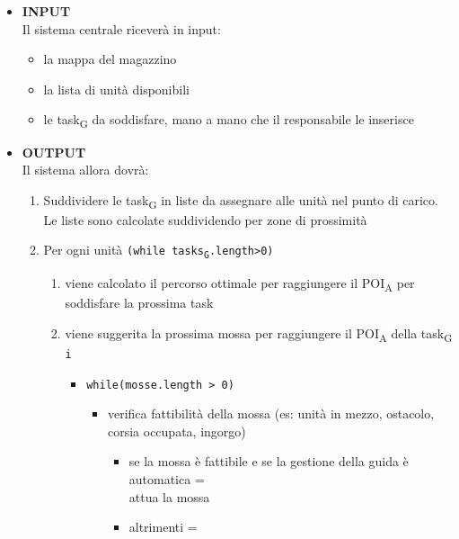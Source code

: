 \begin{itemize}
	\item{\textbf{INPUT}\\
	Il sistema centrale riceverà in input:
	\begin{itemize}
		\item{la mappa del magazzino\\}
		\item{la lista di unità disponibili\\}
		\item{le \gls{task}\textsubscript{G} da soddisfare, mano a mano che il responsabile le inserisce\\}
	\end{itemize}
	}
	\item{\textbf{OUTPUT}\\
	Il sistema allora dovrà:
	\begin{enumerate}
		\item{Suddividere le \gls{task}\textsubscript{G} in liste da assegnare alle unità nel punto di carico. \\
		Le liste sono calcolate suddividendo per zone di prossimità\\}
		\item{Per ogni unità \texttt{(while \glspl{task}\textsubscript{G}.length>0)}\\}
		\begin{enumerate}
			\item{viene calcolato il percorso ottimale per raggiungere il \acrshort{POI}\textsubscript{A} per soddisfare la prossima task\\}
			\item{viene suggerita la prossima mossa per raggiungere il \acrshort{POI}\textsubscript{A} della \gls{task}\textsubscript{G} \texttt{i}\\}	
			\begin{itemize}
				\item{\texttt{while(mosse.length > 0)}\\}
				\begin{itemize}
					\item{verifica fattibilità della mossa (es: unità in mezzo, ostacolo, corsia occupata, ingorgo)\\}
					\begin{itemize}
						\item{se la mossa è fattibile e se la gestione della guida è automatica = \\
						 attua la mossa\\}
						\item{altrimenti = \\
}
\end{itemize}
\end{itemize}
\end{itemize}
\end{enumerate}
\end{enumerate}}
\end{itemize}

